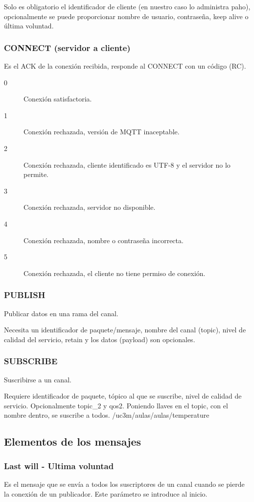 \documentclass[12pt]{report} %
\begin{document}
Solo es obligatorio el identificador de cliente (en nuestro caso lo administra paho), opcionalmente se puede proporcionar nombre de usuario, contraseña, keep alive o última voluntad.

\subsubsection{CONNECT (servidor a cliente)}
Es el ACK de la conexión recibida, responde al CONNECT con un código (RC).
\begin{description}
	\item[0] Conexión satisfactoria.
	\item[1] Conexión rechazada, versión de MQTT inaceptable.	
	\item[2] Conexión rechazada, cliente identificado es UTF-8 y el servidor no lo permite.	
	\item[3] Conexión rechazada, servidor no disponible.	
	\item[4] Conexión rechazada, nombre o contraseña incorrecta.
	\item[5] Conexión rechazada, el cliente no tiene permiso de conexión.
\end{description}

\subsubsection{PUBLISH}
Publicar datos en una rama del canal. 

Necesita un identificador de paquete/mensaje, nombre del canal (topic), nivel de calidad del servicio, retain y los datos (payload) son opcionales.

\subsubsection{SUBSCRIBE}
Suscribirse a un canal.

Requiere identificador de paquete, tópico al que se suscribe, nivel de calidad de servicio. Opcionalmente topic\_2 y qos2. Poniendo llaves en el topic, con el nombre dentro, se suscribe a todos. /uc3m/aulas/{aulas}/temperature

\subsection{Elementos de los mensajes} 

\subsubsection{Last will - Ultima voluntad} 
Es el mensaje que se envía a todos los suscriptores de un canal cuando se pierde la conexión de un publicador. Este parámetro se introduce al inicio.
\end{document}
